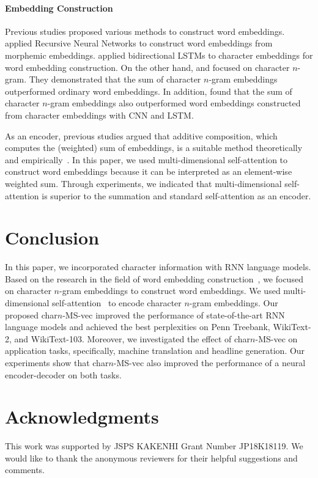 \documentclass[letterpaper]{article} %
\begin{document}
\paragraph{Embedding Construction}
Previous studies proposed various methods to construct word embeddings.
\cite{luong-socher-manning:2013:CoNLL-2013} applied Recursive Neural Networks to construct word embeddings from morphemic embeddings.
\cite{ling-EtAl:2015:EMNLP2} applied bidirectional LSTMs to character embeddings for word embedding construction.
On the other hand, \cite{TACL999} and \cite{wieting-EtAl:2016:EMNLP2016} focused on character $n$-gram.
They demonstrated that the sum of character $n$-gram embeddings outperformed ordinary word embeddings.
In addition, \cite{wieting-EtAl:2016:EMNLP2016} found that the sum of character $n$-gram embeddings also outperformed word embeddings constructed from character embeddings with CNN and LSTM.


As an encoder, previous studies argued that additive composition, which computes the (weighted) sum of embeddings, is a suitable method theoretically~\cite{rantian:additive} and empirically~\cite{Muraoka-EtAl:2014:PACLIC,takase-okazaki-inui:2016:P16-1}.
In this paper, we used multi-dimensional self-attention to construct word embeddings because it can be interpreted as an element-wise weighted sum.
Through experiments, we indicated that multi-dimensional self-attention is superior to the summation and standard self-attention as an encoder.



\section{Conclusion}
In this paper, we incorporated character information with RNN language models.
Based on the research in the field of word embedding construction~\cite{wieting-EtAl:2016:EMNLP2016}, we focused on character $n$-gram embeddings to construct word embeddings.
We used multi-dimensional self-attention~\cite{shen2018disan} to encode character $n$-gram embeddings.
Our proposed char$n$-MS-vec improved the performance of state-of-the-art RNN language models and achieved the best perplexities on Penn Treebank, WikiText-2, and WikiText-103.
Moreover, we investigated the effect of char$n$-MS-vec on application tasks, specifically, machine translation and headline generation.
Our experiments show that char$n$-MS-vec also improved the performance of a neural encoder-decoder on both tasks.

\section*{Acknowledgments}
This work was supported by JSPS KAKENHI Grant Number JP18K18119.
We would like to thank the anonymous reviewers for their helpful suggestions and comments.

\fontsize{9.0pt}{10.0pt}


\end{document}
